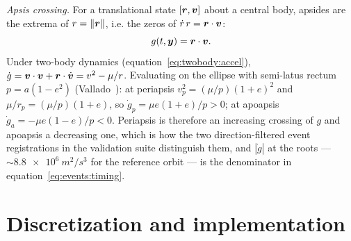 \emph{Apsis crossing.} For a translational state $[\bm{r}, \bm{v}]$ about a
central body, apsides are the extrema of $r = \left\lVert \bm{r} \right\rVert$, i.e. the
zeros of $\dot{r}\,r = \bm{r}\cdot\bm{v}$:
\begin{equation}
  g(t, \bm{y}) = \bm{r} \cdot \bm{v}.
  \label{eq:events:apsis}
\end{equation}
Under two-body dynamics (equation~\eqref{eq:twobody:accel}),
$\dot{g} = \bm{v}\cdot\bm{v} + \bm{r}\cdot\dot{\bm{v}} = v^2 - \mu/r$.
Evaluating on the ellipse with semi-latus rectum $p = a(1 - e^2)$
(Vallado~\cite{vallado2013}): at periapsis $v_p^2 = (\mu/p)(1+e)^2$ and
$\mu/r_p = (\mu/p)(1+e)$, so $\dot{g}_p = \mu e (1 + e)/p > 0$; at apoapsis
$\dot{g}_a = -\mu e (1 - e)/p < 0$. Periapsis is therefore an increasing
crossing of $g$ and apoapsis a decreasing one, which is how the two
direction-filtered event registrations in the validation suite distinguish
them, and $|\dot g|$ at the roots --- $\sim\qty{8.8e6}{m^2/s^3}$ for the
reference orbit --- is the denominator in
equation~\eqref{eq:events:timing}.

\section{Discretization and implementation}
\label{sec:events:implementation}

